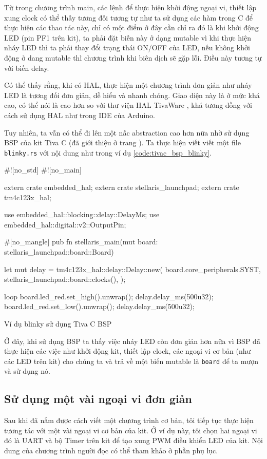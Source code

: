 Từ trong chương trình main, các lệnh để thực hiện khởi động ngoại vi, thiết lập xung clock có thể thấy tương đối tương tự như ta sử dụng các hàm trong C để thực hiện các thao tác này, chỉ có một điểm ở đây cần chỉ ra đó là khi khởi động LED (pin PF1 trên kit), ta phải đặt biến này ở dạng mutable vì khi thực hiện nháy LED thì ta phải thay đổi trạng thái ON/OFF của LED, nếu không khởi động ở dang mutable thì chương trình khi biên dịch sẽ gặp lỗi. Điều này tương tự với biến delay.

Có thể thấy rằng, khi có HAL, thực hiện một chương trình đơn giản như nháy LED là tương đối đơn giản, dễ hiểu và nhanh chóng.
Giao diện này là ở mức khá cao, có thể nói là cao hơn so với thư viện HAL TivaWare \cite{tivac_tivaware}, khá tương đồng với cách sử dụng HAL như trong IDE của Arduino.

Tuy nhiên, ta vẫn có thể đi lên một nấc abstraction cao hơn nữa nhờ sử dụng BSP của kit Tiva C (đã giới thiệu ở trang \pageref{lbl:tivac_bsp}).
Ta thực hiện viết viết một file \texttt{blinky.rs} với nội dung như trong ví dụ \ref{code:tivac_bsp_blinky}.

\begin{listing}[ht]
\begin{rustcode}
#![no_std]
#![no_main]

extern crate embedded_hal;
extern crate stellaris_launchpad;
extern crate tm4c123x_hal;

use embedded_hal::blocking::delay::DelayMs;
use embedded_hal::digital::v2::OutputPin;

#[no_mangle]
pub fn stellaris_main(mut board: stellaris_launchpad::board::Board) {
    let mut delay = tm4c123x_hal::delay::Delay::new(
        board.core_peripherals.SYST,
        stellaris_launchpad::board::clocks(),
    );

    loop {
        board.led_red.set_high().unwrap();
        delay.delay_ms(500u32);
        board.led_red.set_low().unwrap();
        delay.delay_ms(500u32);
    }
}
\end{rustcode}
\caption{Ví dụ blinky sử dụng Tiva C BSP}
\label{code:tivac_bsp_blinky}
\end{listing}

Ở đây, khi sử dụng BSP ta thấy việc nháy LED còn đơn giản hơn nữa vì BSP đã thực hiện các việc như khởi động kit, thiết lập clock, các ngoại vi cơ bản (như các LED trên kit) cho chúng ta và trả về một biến mutable là \texttt{board} để ta mượn và sử dụng nó.

\subsection{Sử dụng một vài ngoại vi đơn giản}\label{lbl:rust_peripheral}
Sau khi đã nắm được cách viết một chương trình cơ bản, tôi tiếp tục thực hiện tương tác với một vài ngoại vi cơ bản của kit.
Ở ví dụ này, tôi chọn hai ngoại vi đó là UART và bộ Timer trên kit để tạo xung PWM điều khiển LED của kit.
Nội dung của chương trình người đọc có thể tham khảo ở phần phụ lục. %

